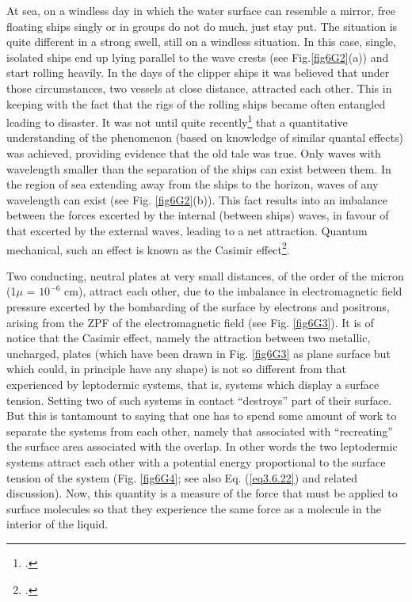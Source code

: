 \begin{subappendices}
At sea, on a windless day in which the water surface can resemble a mirror, free floating
ships singly or in groups do not do much, just stay put. The situation is quite different
in a strong swell, still on a windless situation. In this case, single, isolated ships end up
lying parallel to the wave crests (see Fig.\ref{fig6G2}(a)) and start rolling heavily. In the days
of the clipper ships it was believed that under those circumstances, two vessels at close
distance, attracted each other. This in keeping with the fact that the rigs of the rolling
ships became often entangled leading to disaster. It was not until quite recently\footnote{\cite{Boersma:96}.}
that a quantitative understanding of the phenomenon (based on knowledge of similar quantal
effects) was achieved, providing evidence that the old tale was true.
Only waves with wavelength smaller than the separation of the ships can exist between
them. In the region of sea extending away from the ships to the horizon, waves of any
wavelength can exist (see Fig. \ref{fig6G2}(b)). This fact results into an imbalance between the
forces excerted by the internal (between ships) waves, in favour of that excerted by the
external waves, leading to a net attraction.
Quantum mechanical, such an effect is known as the Casimir effect\footnote{\cite{Casimir:48}.}. 


Two conducting,
neutral plates at very small distances, of the order of the micron (1$\mu$ = $10^{-6}$ cm), attract each
other, due to the imbalance in electromagnetic field pressure excerted by the bombarding
of the surface by electrons and positrons, arising from the ZPF of the electromagnetic field
(see Fig. \ref{fig6G3}). It is of notice that the Casimir effect, namely the attraction between two metallic,
uncharged, plates (which have been drawn in Fig. \ref{fig6G3} as plane surface but which could, in
principle have any shape) is not so different from that experienced by leptodermic systems, that is, systems which display a surface tension. Setting two of such systems in contact
``destroys'' part of their surface.  But this is
tantamount to saying that one has to spend some amount of work to separate the systems from each other, namely that
associated with ``recreating'' the surface area associated with the overlap. In other words
the two leptodermic systems attract each other with a potential energy proportional to the
surface tension of the system (Fig. \ref{fig6G4}; see also Eq. (\ref{eq3.6.22}) and related discussion). Now, this quantity is a measure of the force that
must be applied to surface molecules so that they experience the same force as a molecule
in the interior of the liquid.



\end{subappendices}
